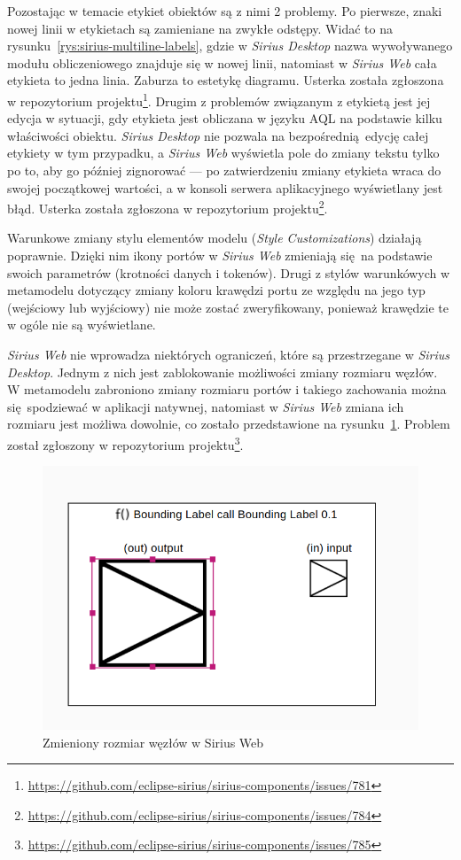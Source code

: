 Pozostając w temacie etykiet obiektów są z nimi 2 problemy. Po pierwsze,
znaki nowej linii w etykietach są zamieniane na zwykłe odstępy. Widać to na
rysunku~\ref{rys:sirius-multiline-labels}, gdzie w \emph{Sirius Desktop} nazwa
wywoływanego modułu
obliczeniowego znajduje się w nowej linii, natomiast w \emph{Sirius Web} cała
etykieta to jedna linia. Zaburza to estetykę diagramu. Usterka została
zgłoszona w repozytorium projektu\footnote{
	\url{https://github.com/eclipse-sirius/sirius-components/issues/781}
}. Drugim z problemów związanym z etykietą jest jej edycja w sytuacji, gdy
etykieta jest obliczana w języku \gls{AQL} na podstawie kilku właściwości
obiektu. \emph{Sirius Desktop} nie pozwala na bezpośrednią edycję całej
etykiety w tym przypadku, a \emph{Sirius Web} wyświetla pole do zmiany tekstu
tylko po to, aby go później zignorować --- po zatwierdzeniu zmiany etykieta
wraca do swojej początkowej wartości, a w konsoli serwera aplikacyjnego
wyświetlany jest błąd. Usterka została zgłoszona w repozytorium
projektu\footnote{
	\url{https://github.com/eclipse-sirius/sirius-components/issues/784}
}.

Warunkowe zmiany stylu elementów modelu (\emph{Style Customizations}) działają
poprawnie. Dzięki nim ikony portów w \emph{Sirius Web} zmieniają się na
podstawie swoich parametrów (krotności danych i tokenów). Drugi z stylów
warunkówych w metamodelu dotyczący zmiany koloru krawędzi portu ze względu na
jego typ (wejściowy lub wyjściowy) nie może zostać zweryfikowany, ponieważ
krawędzie te w ogóle nie są wyświetlane.

\emph{Sirius Web} nie wprowadza niektórych ograniczeń, które są przestrzegane w
\emph{Sirius Desktop}. Jednym z nich jest zablokowanie możliwości zmiany
rozmiaru węzłów. W metamodelu zabroniono zmiany rozmiaru portów i takiego
zachowania można się spodziewać w aplikacji natywnej, natomiast w \emph{Sirius
	Web} zmiana ich rozmiaru jest możliwa dowolnie, co zostało
przedstawione na
rysunku~\ref{rys:change-node-size}. Problem został zgłoszony w repozytorium
projektu\footnote{
	\url{https://github.com/eclipse-sirius/sirius-components/issues/785}}.

\begin{figure}[!hb]
  \centering

  \includegraphics[width=0.6\linewidth]{./images/change-node-size.png}
  \caption{Zmieniony rozmiar węzłów w Sirius Web}\label{rys:change-node-size}
\end{figure}

